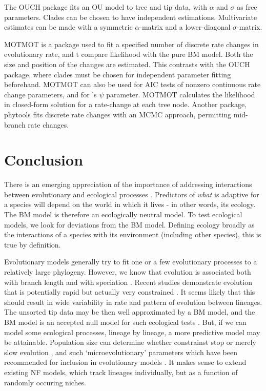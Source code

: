 \documentclass[12pt]{article}
\begin{document}
The OUCH package \citep{king_package_2012} fits an OU model to tree and tip data, with $\alpha$ and $\sigma$ as free parameters. Clades can be chosen to have independent estimations. Multivariate estimates can be made with a symmetric $\alpha$-matrix and a lower-diagonal $\sigma$-matrix.

MOTMOT \citep{thomas_motmot:_2012} is a package used to fit a specified number of discrete rate changes in evolutionary rate, and t compare likelihood with the pure BM model. Both the size and position of the changes are estimated. This contrasts with the OUCH package, where clades must be chosen for independent parameter fitting beforehand. MOTMOT can also be used for AIC tests of nonzero continuous rate change parameters, and for \citet{ingram_speciation_2010}'s $\psi$ parameter. MOTMOT calculates the likelihood in closed-form solution for a rate-change at each tree node. Another package, phytools \citep{revell_phytools:_2012,revell_new_2012} fits discrete rate changes with an MCMC approach, permitting mid-branch rate changes.

\section{Conclusion}

There is an emerging appreciation of the importance of addressing interactions between evolutionary and ecological processes \citep{schoener_newest_2011}.
Predictors of \emph{what} is adaptive for a species will depend on the world in which it lives - in other words, its ecology. 
The BM model is therefore an ecologically neutral model. 
To test ecological models, we look for deviations from the BM model. 
Defining ecology broadly as the interactions of a species with its environment (including other species), this is true by definition.

Evolutionary models generally try to fit one or a few evolutionary processes to a relatively large phylogeny. 
However, we know that evolution is associated both with branch length and with speciation \citep{uyeda_the_2011}.
Recent studies demonstrate evolution that is potentially rapid but actually very constrained \citep{harmon_early_2010,charmantier_adaptive_2008}.
It seems likely that this should result in wide variability in rate and pattern of evolution between lineages.
The unsorted tip data may be then well approximated by a BM model, and the BM model is an accepted null model for such ecological tests \citep{davies_using_2012}.
But, if we can model some ecological processes, lineage by lineage, a more predictive model may be attainable.
Population size can determine whether constrainst stop or merely slow evolution \citep{gomulkiewicz_demographic_2009}, and such `microevolutionary' parameters which have been recommended for inclusion in evolutionary models \citep{yoder_ecological_2010}.
It makes sense to extend existing NF models, which track lineages individually, but as a function of randomly occuring niches. 
\end{document}
